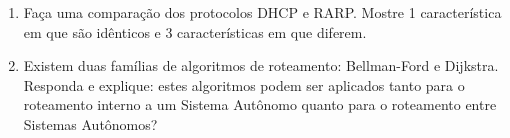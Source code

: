 \documentclass[a4paper,11pt]{article}
\begin{document}
\begin{enumerate}
\item Faça uma comparação dos protocolos DHCP e RARP. Mostre 1 característica em
que são idênticos e 3 características em que diferem.

\item Existem duas famílias de algoritmos de roteamento: Bellman-Ford e
Dijkstra. Responda e explique: estes algoritmos podem ser aplicados tanto para o
roteamento interno a um Sistema Autônomo quanto para o roteamento entre Sistemas
Autônomos?



\end{enumerate}

\end{document}
